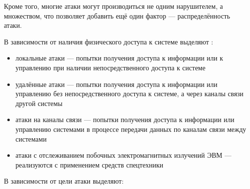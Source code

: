 Кроме того, многие атаки могут производиться не одним нарушителем, а множеством, что позволяет добавить ещё один фактор --- распределённость атаки.

В зависимости от наличия физического доступа к системе выделяют \cite{bib:phys_attack_types}:

\begin{itemize}

\item локальные атаки --- попытки получения доступа к информации или к управлению при наличии непосредственного доступа к системе

\item удалённые атаки --- попытки получения доступа к информации или управлению без непосредственного доступа к системе, а через каналы связи другой системы

\item атаки на каналы связи --- попытки получения доступа к информации или управлению системами в процессе передачи данных по каналам связи между системами

\item атаки с отслеживанием побочных электромагнитных излучений ЭВМ --- реализуются с применением средств спецтехники

\end{itemize}

В зависимости от цели атаки выделяют:

